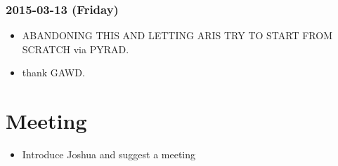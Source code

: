 \documentclass[letterpaper]{scrartcl}
\begin{document}
\subsubsection{2015-03-13 (Friday)}\label{friday-1}

\begin{itemize}
\itemsep1pt\parskip0pt
\item
  ABANDONING THIS AND LETTING ARIS TRY TO START FROM SCRATCH via PYRAD.
\item
  thank GAWD.
\end{itemize}

\section{Meeting}\label{meeting}

\begin{itemize}
\itemsep1pt\parskip0pt
\item
  Introduce Joshua and suggest a meeting
\end{itemize}
\end{document}
